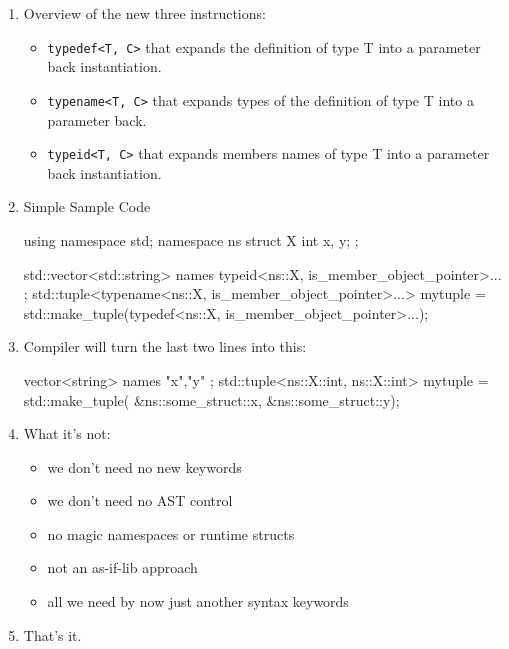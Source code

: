 \begin{enumerate}
\item Overview of the new three instructions:
\begin{itemize}
\item \texttt{typedef<T, C>} that expands the definition of type T into a parameter back instantiation. 
\item \texttt{typename<T, C>} that expands types of the definition of type T into a parameter back. 
\item \texttt{typeid<T, C>} that expands members names of type T into a parameter back instantiation. 
\end{itemize}
\item Simple Sample Code
\begin{codeblock}
using namespace std;
namespace ns {
 struct X {
  int x, y;
 };
}

std::vector<std::string> names{ typeid<ns::X, is_member_object_pointer>... };
std::tuple<typename<ns::X, is_member_object_pointer>...>
     mytuple = std::make_tuple(typedef<ns::X, is_member_object_pointer>...);

\end{codeblock}
\item Compiler will turn the last two lines into this:
\begin{codeblock}
vector<string> names { "x","y" };
std::tuple<ns::X::int, ns::X::int>
       mytuple = std::make_tuple(
                &ns::some_struct::x,
                &ns::some_struct::y);
\end{codeblock}
\item What it's not:
\begin{itemize}
	\item we don't need no new keywords
	\item we don't need no AST control
	\item no magic namespaces or runtime structs
	\item not an as-if-lib approach
	\item all we need by now just another syntax keywords
\end{itemize}
\item That's it.
\end{enumerate}